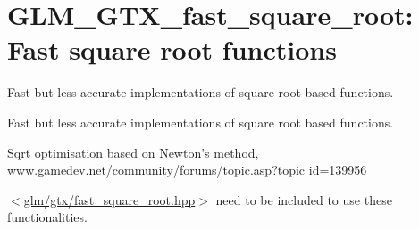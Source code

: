 \hypertarget{group__gtx__fast__square__root}{\section{\-G\-L\-M\-\_\-\-G\-T\-X\-\_\-fast\-\_\-square\-\_\-root\-: \-Fast square root functions}
\label{group__gtx__fast__square__root}
}


\-Fast but less accurate implementations of square root based functions.  


\-Fast but less accurate implementations of square root based functions. 
\begin{DoxyItemize}
\item \-Sqrt optimisation based on \-Newton's method, www.\-gamedev.\-net/community/forums/topic.asp?topic id=139956
\end{DoxyItemize}

$<$\hyperlink{fast__square__root_8hpp}{glm/gtx/fast\-\_\-square\-\_\-root.\-hpp}$>$ need to be included to use these functionalities. 